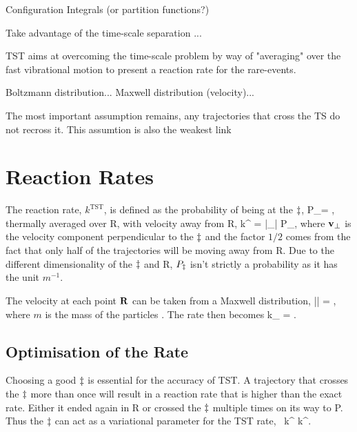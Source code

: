 \bit
\item Configuration Integrals (or partition functions?)
\eit

Take advantage of the time-scale separation ...

TST aims at overcoming the time-scale problem by way of "averaging" over the fast vibrational motion to present a reaction rate for the rare-events.

Boltzmann distribution...
Maxwell distribution (velocity)...


\incomplete

The most important assumption remains, any trajectories that cross the TS do not recross it.
This assumtion is also the weakest link \expand

\section{Reaction Rates}
The reaction rate, $k^\text{TST}$, is defined as the probability of being at the $\ddagger$,
P_\ts = ,
\eeq
thermally averaged over R, with velocity away from R,\citemiss
{}
k^ = |_\perp| P_\ts,
\eeq
where ${\mathrm{\mathbf{\bm{v}}}}_\perp$ is the velocity component perpendicular to the $\ddagger$ and the factor $1/2$ comes from the fact that only half of the trajectories will be moving away from R.
Due to the different dimensionality of the $\ddagger$ and R, $P_\ddagger$ isn't strictly a probability as it has the unit $\unit{m^{-1}}$. \expand

The velocity at each point ${\mathrm{\mathbf{\bm{R}}}}$ can be taken from a Maxwell distribution, 
\langle || \rangle = ,
\eeq
where $m$ is the mass of the particles .
The rate then becomes
k_ =  . \quad \text{\expand}
\eeq

\placeholder

\subsection{Optimisation of the Rate}
Choosing a good $\ddagger$ is essential for the accuracy of TST.
A trajectory that crosses the $\ddagger$ more than once will result in a reaction rate that is higher than the exact rate.
Either it ended again in R or crossed the $\ddagger$ multiple times on its way to P.
Thus the $\ddagger$ can act as a variational parameter for the TST rate,~\cite{vtst-1938, vtst-review-1984, vtst-2005}
k^ \ge k^.
\eeq

